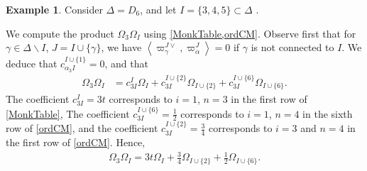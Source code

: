 \documentclass[10pt]{article}
\numberwithin{thm}{section}
\theoremstyle{definition}
\newtheorem{example}[thm]{Example}
\theoremstyle{remark}
\begin{document}
\begin{example}
Consider $\Delta=D_6$, and let $I=\{3,4,5\}\subset\Delta$ .
\begin{center}
\end{center}
We compute the product $\Omega_{3}\Omega_I$ using \cref{MonkTable,ordCM}.
Observe first that for $\gamma\in\Delta\backslash I$, $J=I\cup\{\gamma\}$,
we have $\left\langle\varpi_\gamma^{J\vee},\varpi_\alpha^J\right\rangle=0$ if $\gamma$ is not connected to $I$.
We deduce that $c_{\alpha_3I}^{I\cup\{1\}}=0$, and that
\begin{align*}
\Omega_{3}\Omega_I%
&=c_{3I}^I\Omega_I+c_{3I}^{I\cup\{2\}}\Omega_{I\cup\{2\}}+c_{3I}^{I\cup\{6\}}\Omega_{I\cup\{6\}}.
\end{align*}
The coefficient $c_{3I}^I=3t$ corresponds to $i=1$, $n=3$ in the first row of \cref{MonkTable},
The coefficient $c_{3I}^{I\cup\{6\}}=\frac12$ corresponds to 
$i=1$, $n=4$ in the sixth row of \cref{ordCM},
and the coefficient 
$
c_{3I}^{I\cup\{2\}}=\frac34$ corresponds to $i=3$ and $n=4$ in the first row of \cref{ordCM}.
Hence, 
\begin{align*}
\Omega_{3}\Omega_I=3t\Omega_I+\frac34\Omega_{I\cup\{2\}}+\frac12\Omega_{I\cup\{6\}}.
\end{align*}
\end{example}






\end{document}
